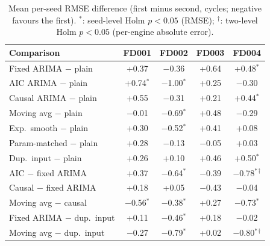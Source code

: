 \documentclass[conference]{IEEEtran}
\begin{document}
\begin{table}[t]
\centering
\caption{Mean per-seed RMSE difference (first minus second, cycles; negative favours the first). $^*$: seed-level Holm $p<0.05$ (RMSE); $^\dagger$: two-level Holm $p<0.05$ (per-engine absolute error).}
\label{tab:paired}
\footnotesize
\setlength{\tabcolsep}{2.5pt}
\begin{tabular}{lcccc}
\toprule
Comparison & FD001 & FD002 & FD003 & FD004 \\
\midrule
Fixed ARIMA $-$ plain & +0.37 & $-$0.36 & +0.64 & +0.48$^*$ \\
AIC ARIMA $-$ plain & +0.74$^*$ & $-$1.00$^*$ & +0.25 & $-$0.30 \\
Causal ARIMA $-$ plain & +0.55 & $-$0.31 & +0.21 & +0.44$^*$ \\
Moving avg $-$ plain & $-$0.01 & $-$0.69$^*$ & +0.48 & $-$0.29 \\
Exp.\ smooth $-$ plain & +0.30 & $-$0.52$^*$ & +0.41 & +0.08 \\
Param-matched $-$ plain & +0.28 & $-$0.13 & $-$0.05 & +0.03 \\
Dup.\ input $-$ plain & +0.26 & +0.10 & +0.46 & +0.50$^*$ \\
AIC $-$ fixed ARIMA & +0.37 & $-$0.64$^*$ & $-$0.39 & $-$0.78$^*$$^\dagger$ \\
Causal $-$ fixed ARIMA & +0.18 & +0.05 & $-$0.43 & $-$0.04 \\
Moving avg $-$ causal & $-$0.56$^*$ & $-$0.38$^*$ & +0.27 & $-$0.73$^*$ \\
Fixed ARIMA $-$ dup.\ input & +0.11 & $-$0.46$^*$ & +0.18 & $-$0.02 \\
Moving avg $-$ dup.\ input & $-$0.27 & $-$0.79$^*$ & +0.02 & $-$0.80$^*$$^\dagger$ \\
\bottomrule
\end{tabular}
\end{table}
\end{document}
